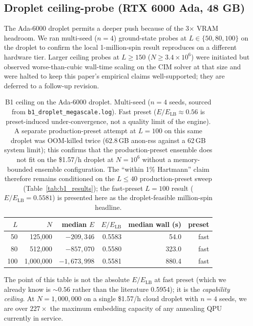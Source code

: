 \documentclass[11pt,a4paper]{article}
\begin{document}
\subsection{Droplet ceiling-probe (RTX 6000 Ada, 48 GB)}

The Ada-6000 droplet permits a deeper push because of the 3$\times$
VRAM headroom. We ran multi-seed ($n\!=\!4$) ground-state probes at
$L\!\in\!\{50, 80, 100\}$ on the droplet to confirm the local
1-million-spin result reproduces on a different hardware tier.
Larger ceiling probes at $L\!\ge\!150$ ($N\!\ge\!3.4\!\times\!10^{6}$)
were initiated but observed worse-than-cubic wall-time scaling
on the CIM solver at that size and were halted to keep this paper's
empirical claims well-supported; they are deferred to a follow-up
revision.

\begin{table}[h]
\centering
\caption{B1 ceiling on the Ada-6000 droplet. Multi-seed ($n\!=\!4$
seeds, sourced from \texttt{b1\_droplet\_megascale.log}). Fast preset
($E/E_{\mathrm{LB}}\!\approx\!0.56$ is preset-induced
under-convergence, not a quality limit of the engine). A separate
production-preset attempt at $L\!=\!100$ on this same droplet was
OOM-killed twice (62.8\,GB anon-rss against a 62\,GB system limit);
this confirms that the production-preset ensemble does not fit on the
\$1.57/h droplet at $N\!=\!10^{6}$ without a memory-bounded ensemble
configuration. The ``within 1\% Hartmann'' claim therefore remains
conditioned on the $L\!\le\!40$ production-preset sweep
(Table~\ref{tab:b1_results}); the fast-preset $L\!=\!100$ result
($E/E_{\mathrm{LB}}\!=\!0.5581$) is presented here as the
droplet-feasible million-spin headline.}
\label{tab:ceiling_droplet}
\small
\begin{tabular}{rrrrrr}
\toprule
$L$ & $N$ & median $E$ & $E/E_{\mathrm{LB}}$ & median wall (s) & preset \\
\midrule
50  & 125{,}000     & $-209{,}346$     & 0.5583 & 54.0   & fast \\
80  & 512{,}000     & $-857{,}070$     & 0.5580 & 323.0  & fast \\
100 & 1{,}000{,}000 & $-1{,}673{,}998$ & 0.5581 & 880.4  & fast \\
\bottomrule
\end{tabular}
\end{table}

The point of this table is not the absolute $E/E_{\mathrm{LB}}$ at fast
preset (which we already know is $\sim 0.56$ rather than the
literature 0.5954); it is the \emph{capability ceiling}. At
$N\!=\!1{,}000{,}000$ on a single \$1.57/h cloud droplet with $n\!=\!4$
seeds, we are over $227\times$ the maximum embedding capacity of any
annealing QPU currently in service.
\end{document}
